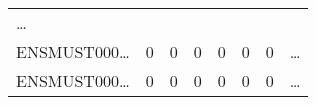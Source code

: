\documentclass[
]{article}
\begin{document}
\begin{longtable}[]{@{}llllllll@{}}
\begin{minipage}[t]{0.03\columnwidth}
\ldots{}\strut
\end{minipage}\tabularnewline
\begin{minipage}[t]{0.11\columnwidth}\raggedright
ENSMUST000\ldots{}\strut
\end{minipage} & \begin{minipage}[t]{0.11\columnwidth}\raggedright
0\strut
\end{minipage} & \begin{minipage}[t]{0.11\columnwidth}\raggedright
0\strut
\end{minipage} & \begin{minipage}[t]{0.11\columnwidth}\raggedright
0\strut
\end{minipage} & \begin{minipage}[t]{0.11\columnwidth}\raggedright
0\strut
\end{minipage} & \begin{minipage}[t]{0.11\columnwidth}\raggedright
0\strut
\end{minipage} & \begin{minipage}[t]{0.11\columnwidth}\raggedright
0\strut
\end{minipage} & \begin{minipage}[t]{0.03\columnwidth}\raggedright
\ldots{}\strut
\end{minipage}\tabularnewline
\begin{minipage}[t]{0.11\columnwidth}\raggedright
ENSMUST000\ldots{}\strut
\end{minipage} & \begin{minipage}[t]{0.11\columnwidth}\raggedright
0\strut
\end{minipage} & \begin{minipage}[t]{0.11\columnwidth}\raggedright
0\strut
\end{minipage} & \begin{minipage}[t]{0.11\columnwidth}\raggedright
0\strut
\end{minipage} & \begin{minipage}[t]{0.11\columnwidth}\raggedright
0\strut
\end{minipage} & \begin{minipage}[t]{0.11\columnwidth}\raggedright
0\strut
\end{minipage} & \begin{minipage}[t]{0.11\columnwidth}\raggedright
0\strut
\end{minipage} & \begin{minipage}[t]{0.03\columnwidth}\raggedright
\ldots{}\strut
\end{minipage}\tabularnewline

\end{longtable}
\end{document}
